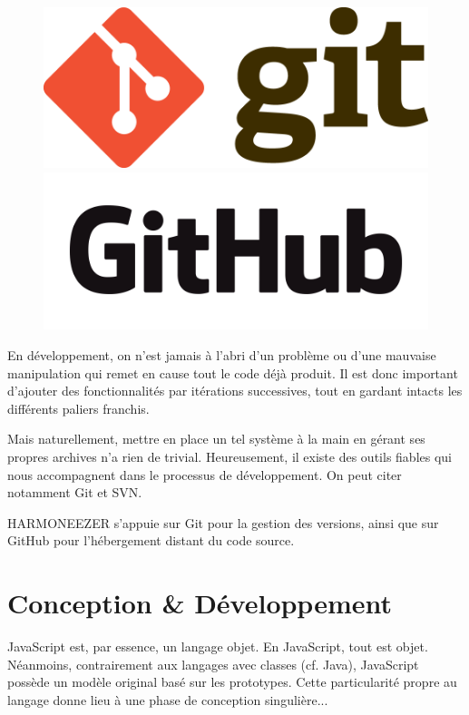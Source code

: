 \documentclass[a4paper,12pt]{article}
\begin{document}
\begin{figure}[!h]
  \begin{center}
    \includegraphics[scale=0.15]{logo-git.png}
    \includegraphics[scale=0.15]{logo-github.png}
  \end{center}
\end{figure}

En développement, on n'est jamais à l'abri d'un problème ou d'une mauvaise manipulation qui remet en cause tout le code déjà produit. Il est donc important d'ajouter des fonctionnalités par itérations successives, tout en gardant intacts les différents paliers franchis.

Mais naturellement, mettre en place un tel système à la main en gérant ses propres archives n'a rien de trivial. Heureusement, il existe des outils fiables qui nous accompagnent dans le processus de développement. On peut citer notamment Git et SVN.

HARMONEEZER s'appuie sur Git pour la gestion des versions, ainsi que sur GitHub pour l'hébergement distant du code source.

\section{Conception \& Développement}

JavaScript est, par essence, un langage objet. En JavaScript, tout est objet. Néanmoins, contrairement aux langages avec classes (cf. Java), JavaScript possède un modèle original basé sur les prototypes. Cette particularité propre au langage donne lieu à une phase de conception singulière...
\end{document}
